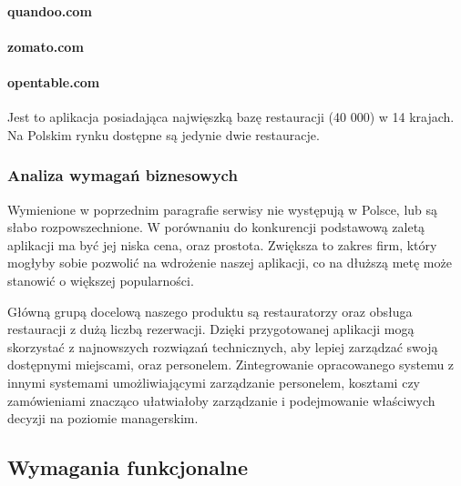 \documentclass{article}
\begin{document}
\paragraph{quandoo.com}


\paragraph{zomato.com}

\paragraph{opentable.com}
Jest to aplikacja posiadająca najwięszką bazę restauracji (40 000) w 14 krajach. Na Polskim rynku dostępne są jedynie dwie restauracje. 

\subsubsection{Analiza wymagań biznesowych}

Wymienione w poprzednim paragrafie serwisy nie występują w Polsce, lub są słabo rozpowszechnione. W porównaniu do konkurencji podstawową zaletą aplikacji ma być jej niska cena, oraz prostota. Zwiększa to zakres firm, który mogłyby sobie pozwolić na wdrożenie naszej aplikacji, co na dłuższą metę może stanowić o większej popularności.

Główną grupą docelową naszego produktu są restauratorzy oraz obsługa restauracji z dużą liczbą rezerwacji. Dzięki przygotowanej aplikacji mogą skorzystać z najnowszych rozwiązań technicznych, aby lepiej zarządzać swoją dostępnymi miejscami, oraz personelem. Zintegrowanie opracowanego systemu z innymi systemami umożliwiającymi zarządzanie personelem, kosztami czy zamówieniami znacząco ułatwiałoby zarządzanie i podejmowanie właściwych decyzji na poziomie managerskim. 


\subsection{Wymagania funkcjonalne}
\end{document}
